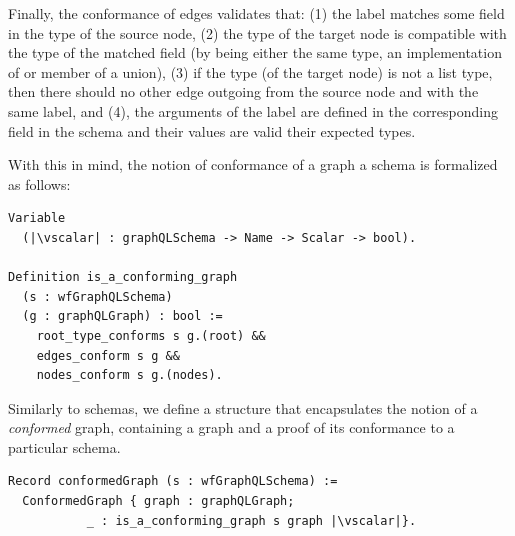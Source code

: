 Finally, the conformance of edges validates that: (1) the label
matches some field in the type of the source node, (2) the type of the
target node is compatible with the type of the matched field (by being
either the same type, an implementation of or member of a union), (3)
if the type (of the target node) is not a list type, then there should
no other 
edge outgoing from the source node and with the same label, and (4), the
arguments of the label are defined in the corresponding field in the schema and
their values are valid \wrt their expected types. 




With this in mind, the notion of conformance of a graph \wrt a schema is formalized as follows:
%
\begin{verbatim}
Variable 
  (|\vscalar| : graphQLSchema -> Name -> Scalar -> bool).
  
Definition is_a_conforming_graph 
  (s : wfGraphQLSchema) 
  (g : graphQLGraph) : bool :=
    root_type_conforms s g.(root) &&
    edges_conform s g &&
    nodes_conform s g.(nodes).
\end{verbatim}
%

Similarly to \gql schemas, we define a structure that encapsulates the notion of a \textit{conformed} graph, containing a graph and a proof of its conformance to a particular schema.
\begin{verbatim}
Record conformedGraph (s : wfGraphQLSchema) :=
  ConformedGraph { graph : graphQLGraph;
           _ : is_a_conforming_graph s graph |\vscalar|}.
\end{verbatim}


